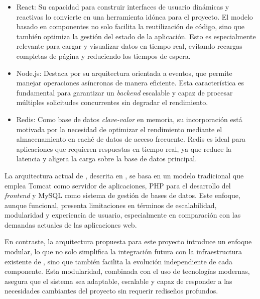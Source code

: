 \begin{itemize}
    \item React: Su capacidad para construir interfaces de usuario dinámicas y reactivas lo convierte en una herramienta idónea para el proyecto. El modelo basado en componentes no solo facilita la reutilización de código, sino que también optimiza la gestión del estado de la aplicación. Esto es especialmente relevante para cargar y visualizar datos en tiempo real, evitando recargas completas de página y reduciendo los tiempos de espera.

    \item Node.js: Destaca por su arquitectura orientada a eventos, que permite manejar operaciones asíncronas de manera eficiente. Esta característica es fundamental para garantizar un \textit{backend} escalable y capaz de procesar múltiples solicitudes concurrentes sin degradar el rendimiento.

    \item Redis: Como base de datos \textit{clave-valor} en memoria, su incorporación está motivada por la necesidad de optimizar el rendimiento mediante el almacenamiento en caché de datos de acceso frecuente. Redis es ideal para aplicaciones que requieren respuestas en tiempo real, ya que reduce la latencia y aligera la carga sobre la base de datos principal.
\end{itemize}

La arquitectura actual de \aer, descrita en \cite{Pedro_Pablo_Gomez_Martin_Marco_Antonio_Gomez_Martin_2017}, se basa en un modelo tradicional que emplea Tomcat como servidor de aplicaciones, PHP para el desarrollo del \textit{frontend} y MySQL como sistema de gestión de bases de datos. Este enfoque, aunque funcional, presenta limitaciones en términos de escalabilidad, modularidad y experiencia de usuario, especialmente en comparación con las demandas actuales de las aplicaciones web.

En contraste, la arquitectura propuesta para este proyecto introduce un enfoque modular, lo que no solo simplifica la integración futura con la infraestructura existente de \aer, sino que también facilita la evolución independiente de cada componente. Esta modularidad, combinada con el uso de tecnologías modernas, asegura que el sistema sea adaptable, escalable y capaz de responder a las necesidades cambiantes del proyecto sin requerir rediseños profundos.
